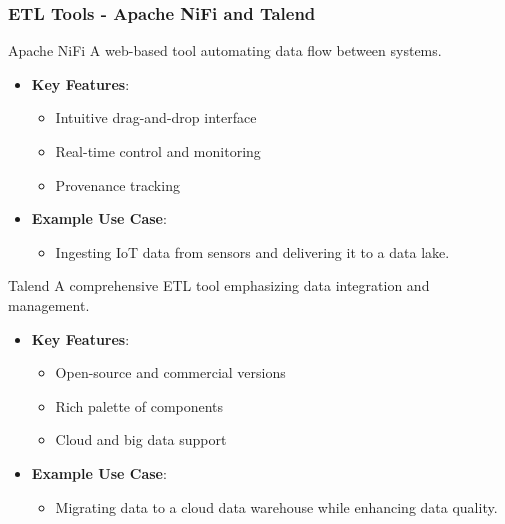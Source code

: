 \documentclass[aspectratio=169]{beamer}
\begin{document}
\begin{frame}[fragile]
    \frametitle{ETL Tools - Apache NiFi and Talend}
    \begin{block}{Apache NiFi}
        A web-based tool automating data flow between systems.
    \end{block}
    
    \begin{itemize}
        \item \textbf{Key Features}:
            \begin{itemize}
                \item Intuitive drag-and-drop interface
                \item Real-time control and monitoring
                \item Provenance tracking
            \end{itemize}
        \item \textbf{Example Use Case}:
            \begin{itemize}
                \item Ingesting IoT data from sensors and delivering it to a data lake.
            \end{itemize}
    \end{itemize}

    \begin{block}{Talend}
        A comprehensive ETL tool emphasizing data integration and management.
    \end{block}

    \begin{itemize}
        \item \textbf{Key Features}:
            \begin{itemize}
                \item Open-source and commercial versions
                \item Rich palette of components
                \item Cloud and big data support
            \end{itemize}
        \item \textbf{Example Use Case}:
            \begin{itemize}
                \item Migrating data to a cloud data warehouse while enhancing data quality.
            \end{itemize}
    \end{itemize}
\end{frame}
\end{document}

